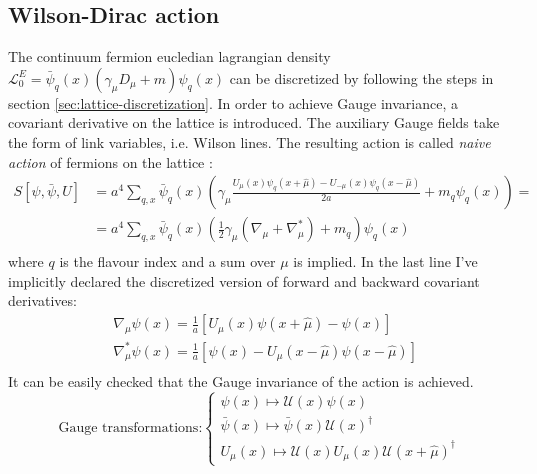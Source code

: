 \documentclass[english, LaM, oneside, noexaminfo]{sapthesis}
\begin{document}
\subsection{Wilson-Dirac action}\label{subsec:naive-wd-action}
\noindent
The continuum fermion eucledian lagrangian density $\mathcal{L}_0^E = \bar \psi_q (x) \left( \gamma_\mu D_\mu + m \right) \psi_q (x)$ can be discretized by following the steps in section \ref{sec:lattice-discretization}.
In order to achieve Gauge invariance, a covariant derivative on the lattice is introduced.
The auxiliary Gauge fields take the form of link variables, i.e. Wilson lines.
The resulting action is called \textit{naive action} of fermions on the lattice \cite{montvay-munster}\cite{gattringer-lang}:
\begin{equation*}
    \begin{aligned}
        S [\psi,\bar \psi, U]
        & = a^4\sum_{q,x} \bar \psi_q (x) \left( \gamma_\mu \frac{U_\mu (x) \psi_q (x+\hat\mu) - U_{-\mu}(x)\psi_q(x-\hat\mu)}{2a} + m_q \psi_q (x) \right) = \\
        & = a^4\sum_{q,x} \bar \psi_q (x) \left( \frac{1}{2}\gamma_\mu (\nabla_\mu + \nabla^*_\mu) + m_q \right) \psi_q (x)  \\
    \end{aligned} 
\end{equation*}
where $q$ is the flavour index and a sum over $\mu$ is implied.
In the last line I've implicitly declared the discretized version of forward and backward covariant derivatives:
\begin{equation*}
    \begin{aligned}
        & \nabla_\mu \psi (x) = \frac{1}{a}\left[U_\mu (x) \psi (x+\hat\mu)-\psi (x)\right] \\
        & \nabla^*_\mu \psi (x) = \frac{1}{a}\left[\psi (x) - U_\mu (x-\hat\mu) \psi (x-\hat\mu)\right] \\
    \end{aligned}
\end{equation*}
It can be easily checked that the Gauge invariance of the action is achieved.
\begin{equation*}
    \text{Gauge transformations:} 
    \begin{cases}
        \psi (x) \mapsto \mathcal{U}(x) \psi (x) \\
        \bar\psi (x) \mapsto \bar\psi (x) \mathcal{U}(x)^\dagger \\
        U_\mu (x) \mapsto \mathcal{U} (x) U_\mu (x) \mathcal{U} (x+\hat\mu)^\dagger
    \end{cases}
\end{equation*}
\end{document}
